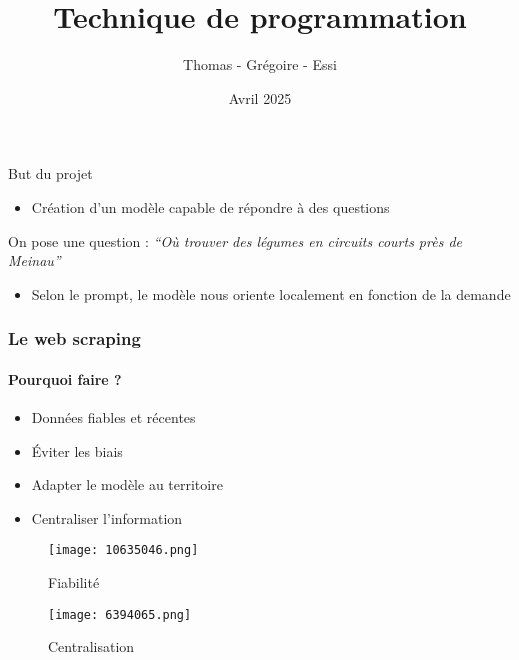 \documentclass{beamer}
\title{Technique de programmation}
\author{Thomas - Grégoire - Essi}
\date{Avril 2025}
\institute[Université de Strasbourg]{Université de Strasbourg}
\begin{document}
\maketitle

\begin{frame}{But du projet}
\begin{itemize}
    \item Création d'un modèle capable de répondre à des questions
\end{itemize}
\vspace{1cm}

    \begin{block}{On pose une question :}
        \textit{“Où trouver des légumes en circuits courts près de Meinau”}
    \end{block}
\vspace{1cm}

\begin{itemize}
    \item Selon le prompt, le modèle nous oriente localement en fonction de la demande
\end{itemize}    
\end{frame}


\begin{frame}
\frametitle{Le web scraping}
\framesubtitle{Pourquoi faire ?}

\begin{itemize}
    \item Données fiables et récentes
    \item Éviter les biais 
    \item Adapter le modèle au territoire
    \item Centraliser l’information
\end{itemize}

\begin{figure}[ht]
    \centering
    \begin{minipage}{0.25\linewidth}
        \centering
        \texttt{[image: 10635046.png]}
        \caption{Fiabilité}
        \label{fig:image1}
    \end{minipage}
    \hfill
    \begin{minipage}{0.25\linewidth}
        \centering
        \texttt{[image: 6394065.png]}
        \caption{Centralisation}
        \label{fig:image2}
    \end{minipage}
\end{figure}
    
\end{frame}
\end{document}
